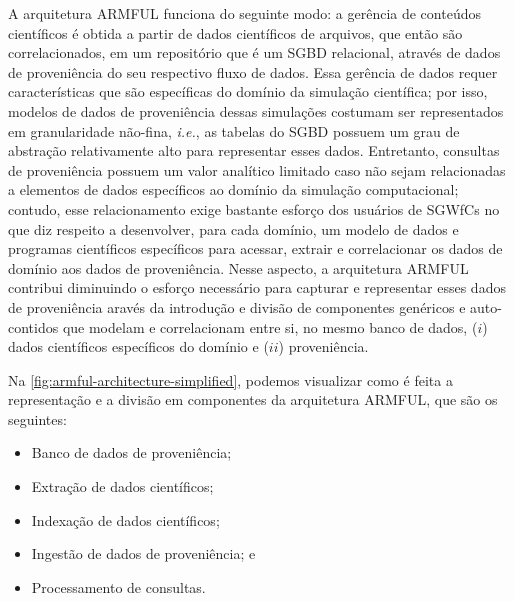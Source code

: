 A arquitetura ARMFUL funciona do seguinte modo: a gerência de conteúdos científicos é obtida a partir de dados científicos de arquivos, que então são correlacionados, em um repositório que é um SGBD relacional, através de dados de proveniência do seu respectivo fluxo de dados. Essa gerência de dados requer características que são específicas do domínio da simulação científica; por isso, modelos de dados de proveniência dessas simulações costumam ser representados em granularidade não-fina, \textit{i.e.}, as tabelas do SGBD possuem um grau de abstração relativamente alto para representar esses dados. Entretanto, consultas de proveniência possuem um valor analítico limitado caso não sejam relacionadas a elementos de dados específicos ao domínio da simulação computacional; contudo, esse relacionamento exige bastante esforço dos usuários de SGWfCs no que diz respeito a desenvolver, para cada domínio, um modelo de dados e programas científicos específicos para acessar, extrair e correlacionar os dados de domínio aos dados de proveniência. Nesse aspecto, a arquitetura ARMFUL contribui diminuindo o esforço necessário para capturar e representar esses dados de proveniência aravés da introdução e divisão de componentes genéricos e auto-contidos que modelam e correlacionam entre si, no mesmo banco de dados, (\(i\)) dados científicos específicos do domínio e (\(ii\)) proveniência.

Na \autoref{fig:armful-architecture-simplified}, podemos visualizar como é feita a representação e a divisão em componentes da arquitetura ARMFUL, que são os seguintes:

\begin{itemize}
    \item Banco de dados de proveniência;
    \item Extração de dados científicos;
    \item Indexação de dados científicos;
    \item Ingestão de dados de proveniência; e
    \item Processamento de consultas.
\end{itemize}

